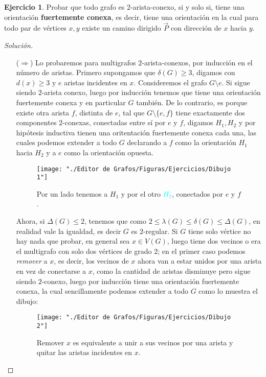\documentclass[12pt]{report}
\theoremstyle{plain}
\theoremstyle{definition}
\newtheorem{exercise}[theorem]{Ejercicio}
\newenvironment{solution}{\begin{proof}[Solución]}{\end{proof}}
\newcommand{\red}[1]{\textcolor{BrickRed}{#1}}
\newcommand{\blue}[1]{\textcolor{Cyan}{#1}}
\newcommand{\yellow}[1]{\textcolor{yellow!80!Black}{#1}} %
\begin{document}
\begin{exercise}
    Probar que todo grafo es $2$-arista-conexo, si y solo si, tiene una orientación \textbf{fuertemente conexa}, es
    decir, tiene una orientación en la cual para todo par de vértices $x,y$ existe un camino dirigido $\overset{
    \rightarrow}{P}$ con dirección de $x$ hacia $y$.
\end{exercise}
\begin{solution}
    \begin{enumerate}
    \item[($\Rightarrow$)] Lo probaremos para multigrafos $2$-arista-conexos, por inducción en el número de aristas.
    Primero supongamos que $\delta (G) \geq 3$, digamos con $d(x) \geq 3$ y $e$ aristas incidentes en $x$.
    Consideremos el grafo $G \setminus e$. Si sigue siendo $2$-arista conexo, luego por inducción tenemos que tiene
    una orientación fuertemente conexa y en particular $G$ también. De lo contrario, es porque existe otra arista $f$, distinta de $e$, tal que $
    G\setminus \{e,f\}$
    tiene
    exactamente dos componentes $2$-conexas, conectadas entre sí por $e$ y $f$, digamos $H_1,H_2$ y por hipótesis
    inductiva
    tienen una
    oritentación
    fuertemente conexa cada una, las cuales podemos extender a todo $G$ declarando a $f$ como la orientación $H_1$
    hacia $H_2$ y a $e$ como la orientación opuesta.
    \begin{figure}
        \centering
        \texttt{[image: "./Editor de Grafos/Figuras/Ejercicios/Dibujo 1"]}
        \caption{Por un lado tenemos a \red{$H_1$} y por el otro \blue{$H_2$}, conectados por \yellow{$e$} y \yellow{$f$}.}
    \end{figure}


    Ahora, si $\Delta (G) \leq 2$, tenemos que como $2 \leq \lambda (G) \leq \delta (G) \leq \Delta (G)$, en realidad
     vale la igualdad, es decir $G$ es $2$-regular. Si $G$ tiene solo vértice no hay nada que probar, en general sea $x \in V(G)$, luego tiene dos vecinos o era el multigrafo con solo dos vértices de grado $2$; en el primer caso podemos \textit{remover} a $x$, es decir, los vecinos de $x$ ahora van a estar unidos por una arista en vez de conectarse a $x$, como la cantidad de aristas disminuye pero sigue siendo $2$-conexo, luego por inducción tiene una orientación fuertemente conexa, la cual sencillamente podemos extender a todo $G$ como lo muestra el dibujo:
      \begin{figure}
          \centering
          \texttt{[image: "./Editor de Grafos/Figuras/Ejercicios/Dibujo 2"]}
          \caption{Remover \red{$x$} es equivalente a unir a sus vecinos por una \yellow{arista} y quitar \red{las
          aristas
          incidentes} en
           \red{$x$}.}
      \end{figure}



\end{enumerate}
\end{solution}
\end{document}
